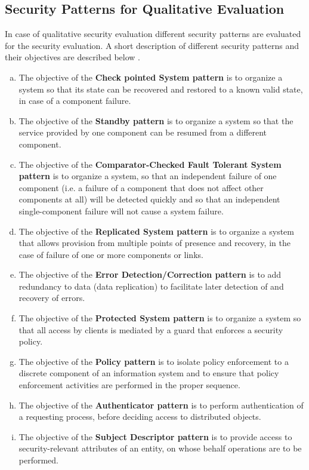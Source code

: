 \documentclass[pdftex,english,oribibl]{llncs}
\begin{document}
\subsection{Security Patterns for Qualitative Evaluation}
In case of qualitative security evaluation different security patterns are evaluated for the security evaluation.  A short description of different security patterns and their objectives are described below \cite{HALKIDIS2006379}.
\begin{enumerate}[(a)]
	\item{The objective of the \textbf{Check pointed System pattern} is to organize a system so that its state can be recovered and restored to a known valid state, in case of a component failure.}
	\item{The objective of the \textbf{Standby pattern} is to organize a system so that the service provided by one component can be resumed from a different component.}
	\item{The objective of the \textbf{Comparator-Checked Fault Tolerant System pattern} is to organize a system, so that an independent failure of one component (i.e. a failure of a component that does not affect other components at all) will be detected quickly and so that an independent single-component failure will not cause a system failure.}
	\item {The objective of the \textbf{Replicated System pattern} is to organize a system that allows provision from multiple points of presence and recovery, in the case of failure of one or more components or links.}
	\item {The objective of the \textbf{Error Detection/Correction pattern} is to add redundancy to data (data replication) to facilitate later detection of and recovery of errors.}
	\item {The objective of the\textbf{ Protected System pattern} is to organize a system so that all access by clients is mediated by a guard that enforces a security policy.}
	\item{The objective of the \textbf{Policy pattern} is to isolate policy enforcement to a discrete component of an information system and to ensure that policy enforcement activities are performed in the proper sequence.}
	\item{The objective of the \textbf{Authenticator pattern} is to perform authentication of a requesting process, before deciding access to distributed objects.}
	\item{The objective of the \textbf{Subject Descriptor pattern} is to provide access to security-relevant attributes of an entity, on whose behalf operations are to be performed.}

\end{enumerate}
\end{document}
